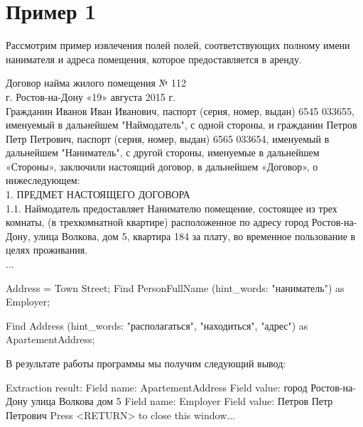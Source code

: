 \section{Пример 1}
Рассмотрим пример извлечения полей полей, соответствующих полному имени нанимателя и адреса помещения, которое предоставляется в аренду.
\begin{myexample}
Договор найма жилого помещения № 112\\
г. Ростов-на-Дону «19» августа 2015 г.\\ 
Гражданин Иванов Иван Иванович, паспорт (серия, номер, выдан) 6545 033655, именуемый в дальнейшем "Наймодатель", с одной стороны, и гражданин Петров Петр Петрович, паспорт (серия, номер, выдан) 6565 033654, именуемый в дальнейшем "Наниматель", с другой стороны, именуемые в дальнейшем «Стороны», заключили настоящий договор, в дальнейшем «Договор», о нижеследующем:\\ 
1. ПРЕДМЕТ НАСТОЯЩЕГО ДОГОВОРА\\
1.1. Наймодатель предоставляет Нанимателю помещение, состоящее из трех комнаты, (в трехкомнатной квартире) расположенное по адресу город Ростов-на-Дону, улица Волкова, дом 5, квартира 184 за плату, во временное пользование в целях проживания. \\
...
\end{myexample}
\begin{myexample}
\label{rules1}
\begin{Verb}
Address = Town Street;
Find PersonFullName (hint_words: "наниматель") as Employer;

Find Address (hint_words: "располагаться", "находиться", "адрес") 
as ApartementAddress;
\end{Verb}
\end{myexample}

В результате работы программы мы получим следующий вывод:
\begin{Verb}
Extraction result:
Field name: ApartementAddress
Field value: город Ростов-на-Дону улица Волкова дом 5 
Field name: Employer
Field value: Петров Петр Петрович 
Press <RETURN> to close this window...
\end{Verb}

